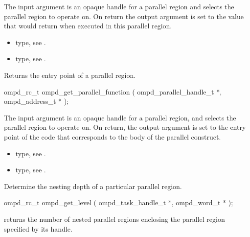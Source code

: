 \argdesc
The input argument  is an opaque handle for a parallel region and selects the parallel region to operate on.
On return the output argument  is set to the value that  would return when
executed in this parallel region.

\crossreferences
\begin{itemize}
	\item {} type, see .
	\item {} type, see .
\end{itemize}

\label{ompd:ompd_get_parallel_function}
\summary
Returns the entry point of a parallel region.

\format
\cspecificstart
\begin{boxedcode}
ompd\_rc\_t ompd\_get\_parallel\_function (
  ompd\_parallel\_handle\_t  *,
  ompd\_address\_t          *
);
\end{boxedcode}
\cspecificend

\descr

\argdesc
The input argument  is an opaque handle for a
parallel region, and selects the parallel region to operate on.
On return,  the output argument  is set to the
entry point of the code that corresponds to the body of the parallel
construct.

\crossreferences
\begin{itemize}
	\item {} type, see .
	\item {} type, see .
\end{itemize}


\label{ompd:ompd_get_level}
\summary
Determine the nesting depth of a particular parallel region.

\format
\cspecificstart
\begin{boxedcode}
ompd\_rc\_t ompd\_get\_level (
  ompd\_task\_handle\_t *, 
  ompd\_word\_t * 
); 
\end{boxedcode}
\cspecificend

\descr
{} returns the number of nested
parallel regions enclosing the parallel region specified by its handle.

